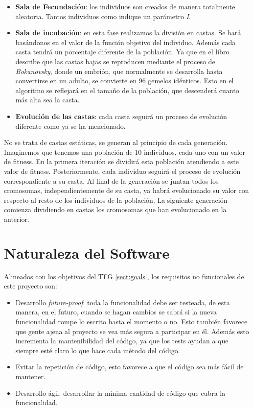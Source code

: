 \begin{itemize}
    \item \textbf{Sala de Fecundación}: los individuos son creados de manera totalmente aleatoria. Tantos individuos
    como indique un parámetro \textit{I}.
    \item \textbf{Sala de incubación}: en esta fase realizamos la división en castas. Se hará basándonos en el valor de
    la función objetivo del individuo. Además cada casta tendrá un porcentaje diferente de la población. Ya que en el libro
    describe que las castas bajas se reproducen mediante el proceso de \textit{Bokanovsky}, donde un embrión, que normalmente 
    se desarrolla hasta convertirse en un adulto, se convierte en 96 gemelos idénticos. Esto en el algoritmo se reflejará 
    en el tamaño de la población, que descenderá cuanto más alta sea la casta.    
    \item \textbf{Evolución de las castas}: cada casta seguirá un proceso de evolución diferente como ya se 
    ha mencionado.
\end{itemize}

No se trata de castas estáticas, se generan al principio de cada generación. Imaginemos que tenemos una población de 10 individuos, cada 
uno con un valor de fitness. En la primera iteración se dividirá esta población atendiendo a este valor de fitness. Posteriormente,
cada individuo seguirá el proceso de evolución correspondiente a su casta. Al final de la generación se juntan todos los cromosomas,
independientemente de su casta, ya habrá evolucionado su valor con respecto al resto de los individuos de la
población. La siguiente generación comienza dividiendo en castas los cromosomas que han evolucionado en la anterior.

\section{Naturaleza del Software} \label{sect:no-funcionales}

Alineados con los objetivos del TFG \ref{sect:goals}, los requisitos no funcionales de este proyecto son:

\begin{itemize}
    \item Desarrollo \emph{future-proof}: toda la funcionalidad debe ser testeada, de esta manera, en el futuro,
    cuando se hagan cambios se sabrá si la nueva funcionalidad rompe lo escrito hasta el momento o no. Esto
    también favorece que gente ajena al proyecto se vea más segura a participar en él. Además esto incrementa
    la mantenibilidad del código, ya que los tests ayudan a que siempre esté claro lo que hace cada método
    del código.
    \item Evitar la repetición de código, esto favorece a que el código sea más fácil de mantener.
    \item Desarrollo ágil: desarrollar la mínima cantidad de código que cubra la funcionalidad.
\end{itemize}


